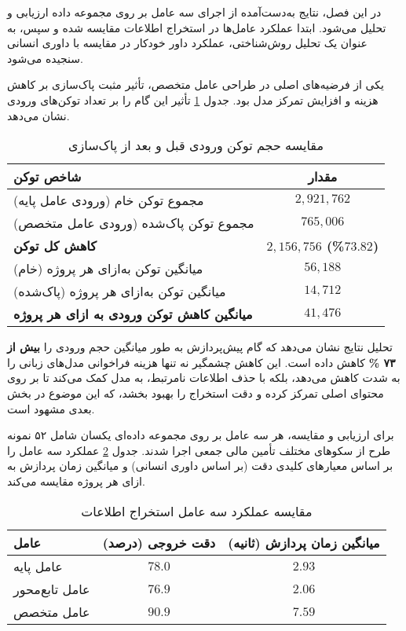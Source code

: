 

در این فصل، نتایج به‌دست‌آمده از اجرای سه عامل بر روی مجموعه داده ارزیابی و تحلیل می‌شود. ابتدا عملکرد عامل‌ها در استخراج اطلاعات مقایسه شده و سپس، به عنوان یک تحلیل روش‌شناختی، عملکرد داور خودکار در مقایسه با داوری انسانی سنجیده می‌شود.


یکی از فرضیه‌های اصلی در طراحی عامل متخصص، تأثیر مثبت پاک‌سازی  بر کاهش هزینه و افزایش تمرکز مدل بود. جدول \ref{tab:token_reduction} تأثیر این گام را بر تعداد توکن‌های ورودی نشان می‌دهد.

\begin{table}[h!]
\centering
\caption{مقایسه حجم توکن ورودی قبل و بعد از پاک‌سازی }
\label{tab:token_reduction}
\begin{tabular}{|l|c|}
\hline
\textbf{شاخص توکن} & \textbf{مقدار} \\
\hline
مجموع توکن خام (ورودی عامل پایه) & $2,921,762$ \\
مجموع توکن پاک‌شده (ورودی عامل متخصص) & $765,006$ \\
\hline
\textbf{کاهش کل توکن} & \textbf{$2,156,756$ (\%$73.82$)} \\
\hline
میانگین توکن به‌ازای هر پروژه (خام) & $56,188$ \\
میانگین توکن به‌ازای هر پروژه (پاک‌شده) & $14,712$ \\
\hline
\textbf{میانگین کاهش توکن ورودی به ازای هر پروژه} & \textbf{$41,476$} \\
\hline
\end{tabular}
\end{table}

\noindent
تحلیل نتایج نشان می‌دهد که گام پیش‌پردازش به طور میانگین حجم ورودی را \textbf{بیش از ۷۳ \%} کاهش داده است. این کاهش چشمگیر نه تنها هزینه فراخوانی مدل‌های زبانی را به شدت کاهش می‌دهد، بلکه با حذف اطلاعات نامرتبط، به مدل کمک می‌کند تا بر روی محتوای اصلی تمرکز کرده و دقت استخراج را بهبود بخشد، که این موضوع در بخش بعدی مشهود است.

برای ارزیابی و مقایسه، هر سه عامل بر روی مجموعه داده‌ای یکسان شامل ۵۲ نمونه طرح از سکوهای مختلف تأمین مالی جمعی اجرا شدند. جدول \ref{tab:agent_performance} عملکرد سه عامل را بر اساس معیارهای کلیدی دقت (بر اساس داوری انسانی) و میانگین زمان پردازش به ازای هر پروژه مقایسه می‌کند.

\begin{table}[h!]
\centering
\caption{مقایسه عملکرد سه عامل استخراج اطلاعات}
\label{tab:agent_performance}
\begin{tabular}{|l|c|c|}
\hline
\textbf{عامل} & \textbf{دقت خروجی (درصد)} & \textbf{میانگین زمان پردازش (ثانیه)} \\
\hline
عامل پایه & $78.0$ & $2.93$ \\
\hline
عامل تابع‌محور & $76.9$ & $2.06$ \\
\hline
عامل متخصص & \textbf{$90.9$} & $7.59$ \\
\hline
\end{tabular}
\end{table}

